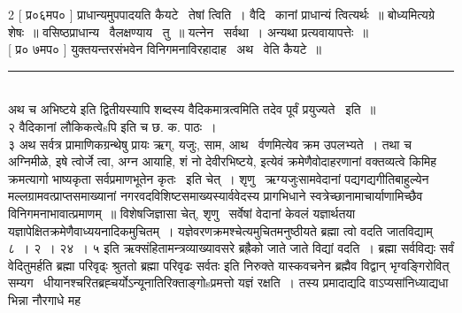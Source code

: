 \documentclass[11pt, openany]{book}
\begin{document}
\begin{multicols}{2}
 [ प्र०६मप० ] प्राधान्यमुपपादयति कैयटे \textendash\ तेषां त्विति~। वैदि \textendash\ कानां प्राधान्यं त्वित्यर्थः~॥ बोध्यमित्यग्रे शेषः~॥ वसिष्ठप्राधान्य \textendash\ वैलक्षण्याय \textendash\ {\qt तु}~॥ यत्नेन \textendash\ सर्वथा~। अन्यथा प्रत्यवायापत्तेः~॥\\

 [ प्र० ७मप० ] युक्तयन्तरसंभवेन विनिगमनाविरहादाह \textendash\ अथ \textendash\ वेति कैयटे~॥

\noindent
\rule{1\linewidth}{0.5pt}\\

\noindent
अथ च {\qt अभिष्टये} इति द्वितीयस्यापि शब्दस्य वैदिकमात्रत्वमिति तदेव पूर्वं प्रयुज्यते \textendash\ इति~॥\\

२ {\qt वैदिकानां लौकिकत्वेsपि} इति च छ. क. पाठः~।\\

३ अथ सर्वत्र प्रामाणिकग्रन्थेषु प्रायः ऋग्, यजुः, साम, आथ \textendash\ र्वणमित्येव क्रम उपलभ्यते~। तथा च अग्निमीळे, इषे त्वोर्जे त्वा, अग्न आयाहि, शं नो देवीरभिष्टये, इत्येवं क्रमेणैवोदाहरणानां वक्तव्यत्वे किमिह क्रमत्यागो भाष्यकृता सर्वप्रमाणभूतेन कृतः \textendash\ इति चेत्~। शृणु \textendash\ ऋग्यजुःसामवेदानां पद्यगद्यगीतिबाहुल्येन मल्लग्रामवत्प्राप्तसमाख्यानां नगरवदविशिष्टसमाख्यस्यार्ववेदस्य प्रागभिधाने स्वत्रेच्छानामाचार्याणामिच्छैव विनिगमनाभावात्प्रमाणम्~॥ विशेषजिज्ञासा चेत्, शृणु \textendash\ सर्वेषां वेदानां केवलं यज्ञार्थतया यज्ञापेक्षितक्रमेणैवाध्ययनादिकमुचितम्~। यज्ञेवरणक्रमश्चेत्यमुचितमनुष्ठीयते {\qt ब्रह्मा त्वो वदति जातविद्याम्} ८~। २~। २४~। ५ इति ऋक्संहितामन्त्रव्याख्यावसरे {\qt ब्रह्रैको जाते जाते विद्यां वदति~। ब्रह्मा सर्वविद्यः सर्वं वेदितुमर्हति} ब्रह्मा परिवृढ्ः श्रुततो ब्रह्मा परिवृढः सर्वतः इति निरुक्ते यास्कवचनेन ब्रह्मैव विद्वान् भृग्वङ्गिरोवित् सम्यग \textendash\ धीयानश्चरितब्रह्चर्योऽन्यूनातिरिक्ताङ्गोsप्रमत्तो यज्ञं रक्षति~। तस्य प्रमादाद्यदि वाऽप्यसांनिध्याद्यधा भिन्ना नौरगाधे मह \textendash\
\end{multicols}

\newpage
\end{document}

